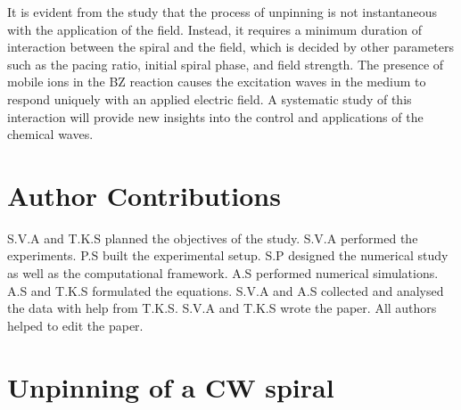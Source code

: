 \documentclass[%
 reprint,
 amsmath,amssymb,
 aps,
prb,
]{revtex4-2}
\begin{document}
It is evident from the study that the process of unpinning is not instantaneous with the application of the field. Instead, it requires a minimum duration of interaction between the spiral and the field, which is decided by other parameters such as the pacing ratio, initial spiral phase, and field strength.
The presence of mobile ions in the BZ reaction causes the excitation waves in the medium to respond uniquely with an applied electric field. A systematic study of this interaction will provide new insights into the control and applications of the chemical waves.
\fi


\begin{acknowledgments}

\end{acknowledgments}

\section{Author Contributions}
S.V.A and T.K.S planned the objectives of the study. S.V.A performed the experiments. P.S built the experimental setup. S.P designed the numerical study as well as the computational framework. A.S performed numerical simulations. A.S and T.K.S formulated the equations. S.V.A and A.S collected and analysed the data with help from T.K.S. S.V.A and T.K.S wrote the paper. All authors helped to edit the paper. 


\appendix
\iffalse
\section{Unpinning of a CW spiral}
\end{document}
